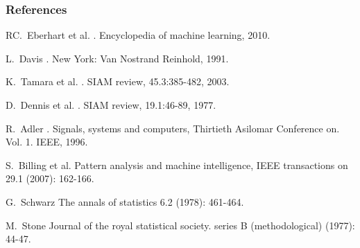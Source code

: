 \documentclass{beamer}
\begin{document}
\begin{frame}[t,allowframebreaks]
    \frametitle{References}
    \begin{thebibliography}{10}    

        \beamertemplatearticlebibitems
          RC.~Eberhart et al.
          .
          \newblock Encyclopedia of machine learning, 2010.

        \beamertemplatearticlebibitems
          L.~Davis
          .
          \newblock New York: Van Nostrand Reinhold, 1991.

        \beamertemplatearticlebibitems
          K.~Tamara et al.
          .
          \newblock SIAM review, 45.3:385-482, 2003.

        \beamertemplatearticlebibitems
          D.~Dennis et al.
          .
          \newblock SIAM review, 19.1:46-89, 1977.

        \beamertemplatearticlebibitems
          R.~Adler
          .
          \newblock Signals, systems and computers, Thirtieth Asilomar Conference on. Vol. 1. IEEE, 1996.

        \beamertemplatearticlebibitems
          S.~Billing et al.
          \newblock Pattern analysis and machine intelligence, IEEE transactions on 29.1 (2007): 162-166.

        \beamertemplatearticlebibitems
          G.~Schwarz
          \newblock The annals of statistics 6.2 (1978): 461-464.

        \beamertemplatearticlebibitems
          M.~Stone
          \newblock Journal of the royal statistical society. series B (methodological) (1977): 44-47.


\end{thebibliography}
\end{frame}
\end{document}

